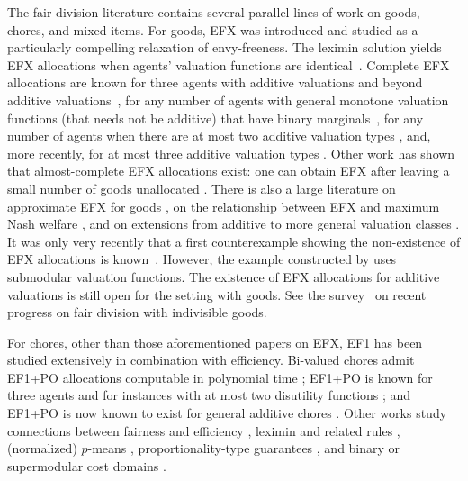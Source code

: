 \documentclass{article}
\theoremstyle{definition}
\begin{document}
The fair division literature contains several parallel lines of work on goods,
chores, and mixed items.  For goods, EFX was introduced and studied as a
particularly compelling relaxation of envy-freeness.  The leximin solution yields
EFX allocations when agents' valuation functions are identical~\citep{plaut2020almost}.  Complete EFX allocations are known
for three agents with additive valuations \citep{chaudhury2024efx} and beyond additive valuations~\citep{akrami2025efx}, for any number of agents with general monotone valuation functions (that needs not be additive) that have binary marginals~\citep{bu2023efx}, for any
number of agents when there are at most two additive valuation types
\citep{mahara2023existence}, and, more recently, for at most three additive
valuation types \citep{hv2025efx}.  Other work has shown that almost-complete EFX
allocations exist: one can obtain EFX after leaving a small number of goods
unallocated \citep{chaudhury2021little,caragiannis2019envy,berger2022almost}.
There is also a large literature on approximate EFX for goods
\citep{amanatidis2020multiple,amanatidis2024pushing,akrami2025efx}, on the
relationship between EFX and maximum Nash welfare
\citep{amanatidis2021maximum}, and on extensions from additive to more general
valuation classes \citep{mahara2024extension}.
It was only very recently that a first counterexample showing the non-existence of EFX allocations is known~\citep{akrami2026counterexample,mackenzie2026counterexamples}.
However, the example constructed by \citet{akrami2026counterexample,mackenzie2026counterexamples} uses submodular valuation functions.
The existence of EFX allocations for additive valuations is still open for the setting with goods.
See the survey~\citep{amanatidis2023fair} on recent progress on fair division with indivisible goods.

For chores, other than those aforementioned papers on EFX, EF1 has been studied extensively in combination with efficiency.
Bi-valued chores admit EF1+PO allocations computable in polynomial time
\citep{ebadian2022fairly,garg2022fair}; EF1+PO is known for three agents and
for instances with at most two disutility functions \citep{garg2023new}; and
EF1+PO is now known to exist for general additive chores
\citep{mahara2026existence}.  Other works study connections between fairness and
efficiency \citep{sun2021connections,barman2025introspectively,barman2026compatibility,barman2025fair,feldman2024optimal}, leximin and related rules
\citep{chen2020fairness}, (normalized) $p$-means
\citep{barman2020tight,eckart2024fairness}, proportionality-type guarantees
\citep{li2022almost}, and binary or supermodular cost domains
\citep{barman2023fair,tao2025existence}.
\end{document}
